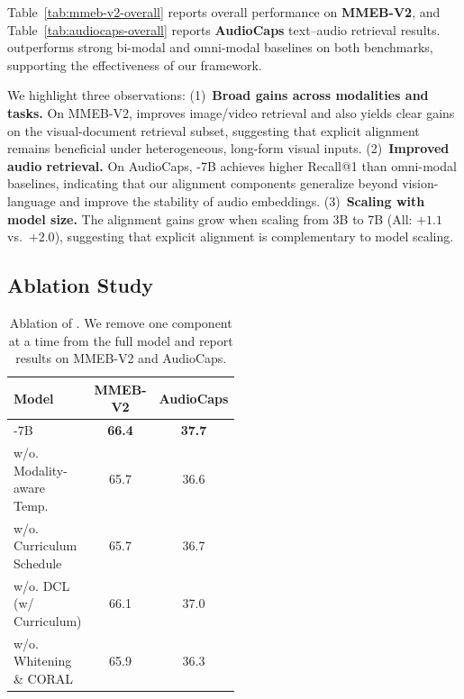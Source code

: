 Table~\ref{tab:mmeb-v2-overall} reports overall performance on \textbf{MMEB-V2}, and Table~\ref{tab:audiocaps-overall} reports \textbf{AudioCaps} text--audio retrieval results.
\ours{} outperforms strong bi-modal and omni-modal baselines on both benchmarks, supporting the effectiveness of our framework.

We highlight three observations:
(1)~\textbf{Broad gains across modalities and tasks.}
On MMEB-V2, \ours{} improves image/video retrieval and also yields clear gains on the visual-document retrieval subset, suggesting that explicit alignment remains beneficial under heterogeneous, long-form visual inputs.
(2)~\textbf{Improved audio retrieval.}
On AudioCaps, \ours{}-7B achieves higher Recall@1 than omni-modal baselines, indicating that our alignment components generalize beyond vision-language and improve the stability of audio embeddings.
(3)~\textbf{Scaling with model size.}
The alignment gains grow when scaling from 3B to 7B (All: $+1.1$ vs.\ $+2.0$), suggesting that explicit alignment is complementary to model scaling.





\subsection{Ablation Study}
\label{sec:ablation}

\begin{table}[!t]
    \centering
    \small
    \caption{Ablation of \ours{}.
We remove one component at a time from the full model and report results on MMEB-V2 and AudioCaps.
}\label{tab:ablation}
    \begin{tabular}{
p{0.5\linewidth} @{}cc
} 
    \toprule
    Model & MMEB-V2 & AudioCaps \\
    \midrule
    \ours{}-7B & \textbf{66.4} & \textbf{37.7} \\
    \midrule
    \quad w/o. Modality-aware Temp. & 65.7 & 36.6 \\
    \quad w/o. Curriculum Schedule & 65.7 & 36.7 \\
    \quad w/o. DCL (w/ Curriculum)  & 66.1 & 37.0 \\
    \quad w/o. Whitening \& CORAL   & 65.9 & 36.3 \\
    \bottomrule
    \end{tabular}
\end{table}


